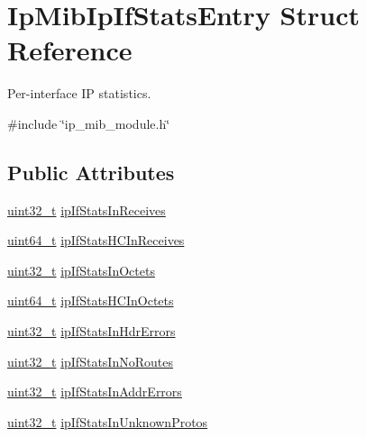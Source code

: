 \hypertarget{structIpMibIpIfStatsEntry}{}\section{Ip\+Mib\+Ip\+If\+Stats\+Entry Struct Reference}
\label{structIpMibIpIfStatsEntry}


Per-\/interface IP statistics.  




{\ttfamily \#include \char`\"{}ip\+\_\+mib\+\_\+module.\+h\char`\"{}}

\subsection*{Public Attributes}
\begin{DoxyCompactItemize}
\item 
\hyperlink{stdint_8h_a435d1572bf3f880d55459d9805097f62}{uint32\+\_\+t} \hyperlink{structIpMibIpIfStatsEntry_aaa791c887a63d5e8f0b2c32987b8d03d}{ip\+If\+Stats\+In\+Receives}
\item 
\hyperlink{stdint_8h_aec6fcb673ff035718c238c8c9d544c47}{uint64\+\_\+t} \hyperlink{structIpMibIpIfStatsEntry_a429fe14ebc59eee54e5e39b0394b493a}{ip\+If\+Stats\+H\+C\+In\+Receives}
\item 
\hyperlink{stdint_8h_a435d1572bf3f880d55459d9805097f62}{uint32\+\_\+t} \hyperlink{structIpMibIpIfStatsEntry_acc887b42d7a8085cf0a0bd8e056d1ff0}{ip\+If\+Stats\+In\+Octets}
\item 
\hyperlink{stdint_8h_aec6fcb673ff035718c238c8c9d544c47}{uint64\+\_\+t} \hyperlink{structIpMibIpIfStatsEntry_ac65c82bfb2625b7df4017712cbee3ed1}{ip\+If\+Stats\+H\+C\+In\+Octets}
\item 
\hyperlink{stdint_8h_a435d1572bf3f880d55459d9805097f62}{uint32\+\_\+t} \hyperlink{structIpMibIpIfStatsEntry_a220ddf77ee17f15ea3ba7ccc2775f680}{ip\+If\+Stats\+In\+Hdr\+Errors}
\item 
\hyperlink{stdint_8h_a435d1572bf3f880d55459d9805097f62}{uint32\+\_\+t} \hyperlink{structIpMibIpIfStatsEntry_ae79dbbfee8456982b7535dd475254dce}{ip\+If\+Stats\+In\+No\+Routes}
\item 
\hyperlink{stdint_8h_a435d1572bf3f880d55459d9805097f62}{uint32\+\_\+t} \hyperlink{structIpMibIpIfStatsEntry_a5f50892c6f5c12eddf7f61e35f728008}{ip\+If\+Stats\+In\+Addr\+Errors}
\item 
\hyperlink{stdint_8h_a435d1572bf3f880d55459d9805097f62}{uint32\+\_\+t} \hyperlink{structIpMibIpIfStatsEntry_a56c46e81b5d0936f70317a9785fb8d33}{ip\+If\+Stats\+In\+Unknown\+Protos}

\end{DoxyCompactItemize}
